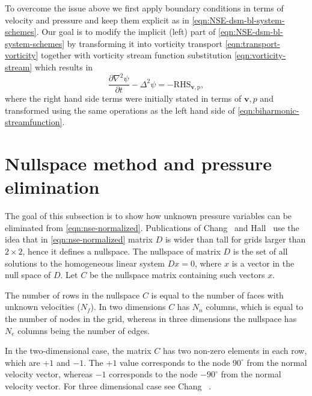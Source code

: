 \documentclass{article}
\numberwithin{equation}{section}
\begin{document}
	To overcome the issue above we first apply boundary conditions in terms of velocity and pressure and keep them explicit as in \cref{eqn:NSE-dsm-bl-system-schemes}. Our goal is to modify the implicit (left) part of \cref{eqn:NSE-dsm-bl-system-schemes} by transforming it into vorticity transport \cref{eqn:transport-vorticity} together with vorticity stream function substitution \cref{eqn:vorticity-stream} which results in 
	\begin{equation}
	\label{eqn:biharmonic-streamfunction}
		\boxed{
		\frac{\partial\nabla ^2 \psi}{\partial t} 
		-\Delta ^2 \psi=-\operatorname{RHS_{\boldsymbol{v},p}},
		}
	\end{equation}
where the right hand side terms were initially stated in terms of $\boldsymbol{v},p$ and transformed using the same operations as the left hand side of \cref{eqn:biharmonic-streamfunction}.

\section{Nullspace method and pressure elimination}\label{sec:nullspace-method}

The goal of this subsection is to show how unknown pressure variables can be eliminated from \cref{eqn:nse-normalized}. Publications of Chang~\cite{Chang:2002} and Hall~\cite{Hall:1980} use the idea that in \cref{eqn:nse-normalized} matrix $D$ is wider than tall for grids larger than $2\times 2$, hence it defines a nullspace. The nullspace of matrix $D$ is the set of all solutions to the homogeneous linear system $Dx = 0$, where $x$ is a vector in the null space of $D$. Let $C$ be the nullspace matrix containing such vectors $x$. 

The number of rows in the nullspace $C$ is equal to the number of faces with unknown velocities ($N_f$). In two dimensions $C$ has $N_n$ columns, which is equal to the number of nodes in the grid, whereas in three dimensions the nullspace has $N_e$ columns being the number of edges. 

In the two-dimensional case, the matrix $C$ has two non-zero elements in each row, which are $+1$ and $-1$. The $+1$ value corresponds to the node $90^\circ$ from the normal velocity vector, whereas $-1$ corresponds to the node $-90^\circ$ from the normal velocity vector.  For three dimensional case see Chang ~\cite{Chang:2002}.
\end{document}
